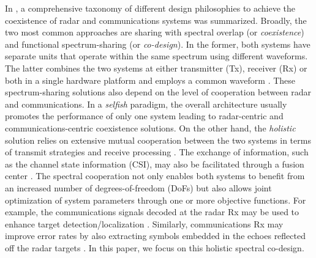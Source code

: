 \documentclass[10pt,journal]{IEEEtran}
\theoremstyle{definition}
\begin{document}
In \cite{d2020uplink}, a comprehensive taxonomy of different design philosophies to achieve the coexistence of radar and communications systems was summarized. Broadly, the two most common approaches are sharing with spectral overlap (or \textit{coexistence}) and functional spectrum-sharing (or \textit{co-design}). In the former, both systems have separate units that operate within the same spectrum using different waveforms. %
The latter combines the two systems at either transmitter (Tx), receiver (Rx) or both in a single hardware platform and employs a common waveform %
\cite{mishra2019toward,liu2018mu,duggal2020doppler}%
. %
These spectrum-sharing solutions also depend on the level of cooperation between radar and communications. In a \textit{selfish} paradigm, the overall architecture usually promotes the performance of only one system leading to radar-centric \cite{alaee2019discrete,bao2019precoding,slavik2019cognitive,sedighi2020localization} and communications-centric \cite{ayyar2019robust} coexistence solutions. %
On the other hand, the \textit{holistic} solution relies on extensive mutual cooperation between the two systems in terms of transmit strategies and receive processing \cite{mahal2017spectral,MCMIMO_RadComm,qian2018joint,rihan2018optimum,Lops2019serveillance,biswas2018fdqos,he2019performance}. The exchange of information, such as the channel state information (CSI), may also be facilitated through a fusion center \cite{MCMIMO_RadComm,he2019performance}.
The spectral cooperation not only enables both systems to benefit from an increased number of degrees-of-freedom (DoFs) but also allows joint optimization of system parameters through one \cite{MCMIMO_RadComm,qian2018joint} or more \cite{biswas2018fdqos,dokhanchi2020multi} objective functions. For example, the communications signals decoded at the radar Rx may be used to enhance target detection/localization \cite{biswas2018fdqos,he2019performance}. Similarly, communications Rx may improve error rates by also extracting symbols embedded in the echoes reflected off the radar targets \cite{liu2018mimo}. In this paper, we focus on this holistic spectral co-design.
\end{document}
